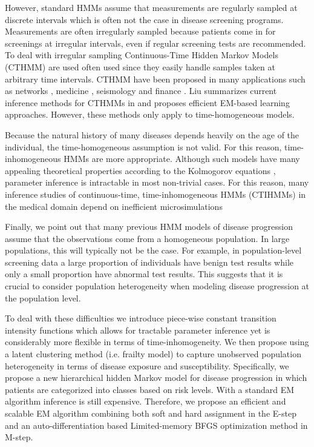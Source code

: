\documentclass{article}
\begin{document}
However, standard HMMs assume that measurements are regularly sampled at discrete intervals which is often not the case in disease screening programs. Measurements are often irregularly sampled because patients come in for screenings at irregular intervals, even if regular screening tests are recommended.
To deal with irregular sampling Continuous-Time Hidden Markov Models (CTHMM) are used often used since they easily handle samples taken at arbitrary time intervals. CTHMM have been proposed in many applications such as networks \cite{Wei_2002}, medicine \cite{Bureau_2003}, seismology \cite{Lu_2017} and finance \cite{Krishnamurthy_2016}.  Liu summarizes current inference methods for CTHMMs in \cite{Liu_2015} and proposes efficient EM-based learning approaches. However, these methods only apply to time-homogeneous models.

Because the natural history of many diseases depends heavily on the age of the individual, the time-homogeneous assumption is not valid.  For this reason, time-inhomogeneous HMMs are more appropriate.  Although such models have many appealing theoretical properties according to the Kolmogorov equations \cite{Zeifman_1994}, parameter inference is intractable in most non-trivial cases. For this reason, many inference studies of continuous-time, time-inhomogeneous HMMs (CTIHMMs) in the medical domain depend on inefficient microsimulations \cite{Sonnernberg_1993,Myers_2000,Canfell_2004}


Finally, we point out that many previous HMM models of disease progression assume that the observations come from a homogeneous population. In large populations, this will typically not be the case. For example, in population-level screening data a large proportion of individuals have benign test results while only a small proportion have abnormal test results. This suggests that it is crucial to consider population heterogeneity when modeling disease progression at the population level.

To deal with these difficulties we introduce piece-wise constant transition intensity functions which allows for tractable parameter inference yet is considerably more flexible in terms of time-inhomogeneity.  We then propose using a latent clustering method (i.e. frailty model) to capture unobserved population heterogeneity in terms of disease exposure and susceptibility.  Specifically, we propose a new hierarchical hidden Markov model for disease progression in which patients are categorized into classes based on risk levels. With a standard EM algorithm inference is still expensive. Therefore, we propose an efficient and scalable EM algorithm combining both soft and hard assignment in the E-step and an auto-differentiation based Limited-memory BFGS optimization method in M-step. 
\end{document}
